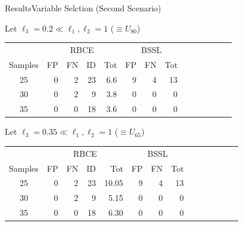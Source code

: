 \documentclass[aspectratio=169]{beamer}					%
\begin{document}
\begin{frame}{Results}{Variable Selction (Second Scenario)}

Let \alert{$\ell_3 = 0.2 \ll \ell_1,\ell_2 = 1$ ($\equiv U_{80}$)}

\begin{table}[h]
    \begin{tabular}{|c||rrr|r||rr|r||rr|r||rr|r|}
  \hline
  &\multicolumn{4}{c||}{RBCE}&\multicolumn{3}{c|}{BSSL}\\
  \cline{2-14}
 Samples & FP & FN & ID & Tot & FP & FN & Tot \\ 
  \hline
25 &   0 &   2 &  23 & 6.6 &  9 &   4 & 13\\ 
  30 &   0 &   2 &   9 & 3.8 &  0 &   0 & 0 \\ 
  35 &   0 &   0 &  18 & 3.6 &  0 &   0 & 0 \\ 
  \hline
\end{tabular}

\end{table}

\pause

Let \alert{$\ell_3 = 0.35 \ll \ell_1,\ell_2 = 1$ ($\equiv U_{65}$)}

\begin{table}[h]
    \begin{tabular}{|c||rrr|r||rr|r||rr|r||rr|r|}
  \hline
  &\multicolumn{4}{c||}{RBCE}&\multicolumn{3}{c|}{BSSL}\\
  \cline{2-14}
 Samples & FP & FN & ID & Tot & FP & FN & Tot \\ 
  \hline
25 &   0 &   2 &  23 & 10.05 &  9 &   4 & 13\\ 
  30 &   0 &   2 &   9 & 5.15 &  0 &   0 & 0 \\ 
  35 &   0 &   0 &  18 & 6.30 &  0 &   0 & 0 \\ 
  \hline
\end{tabular}

\end{table}


\end{frame}

\iffalse
\end{document}
